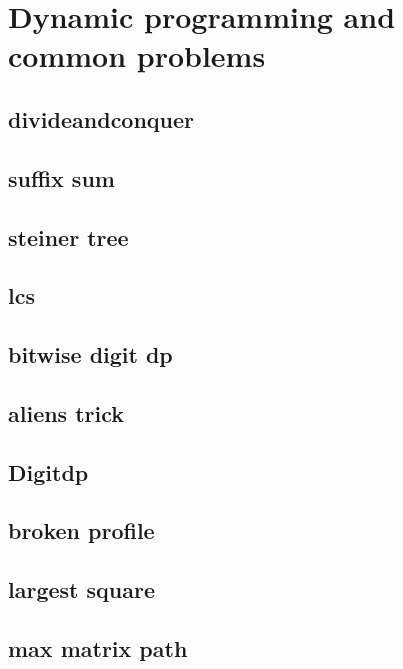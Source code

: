 \section{Dynamic programming and common problems}
\subsection{divideandconquer}
\raggedbottom
\hrulefill
\subsection{suffix sum}
\raggedbottom
\hrulefill
\subsection{steiner tree}
\raggedbottom
\hrulefill
\subsection{lcs}
\raggedbottom
\hrulefill
\subsection{bitwise digit dp}
\raggedbottom
\hrulefill
\subsection{aliens trick}
\raggedbottom
\hrulefill
\subsection{Digitdp}
\raggedbottom
\hrulefill
\subsection{broken profile}
\raggedbottom
\hrulefill
\subsection{largest square}
\raggedbottom
\hrulefill
\subsection{max matrix path}
\raggedbottom
\hrulefill
